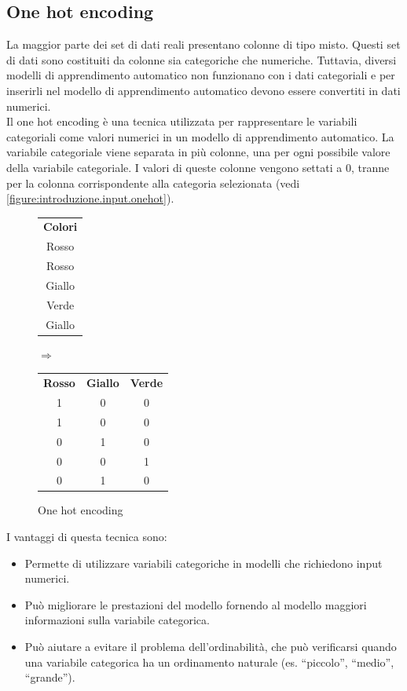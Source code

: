 \documentclass[
	a4paper,
	11pt,
	oneside
]{book}
\theoremstyle{std}
\begin{document}
	\subsection{One hot encoding}
	La maggior parte dei set di dati reali presentano colonne di tipo misto. Questi set di dati sono costituiti da colonne sia categoriche che numeriche. Tuttavia, diversi modelli di apprendimento automatico non funzionano con i dati categoriali e per inserirli nel modello di apprendimento automatico devono essere convertiti in dati numerici. \\
	Il one hot encoding è una tecnica utilizzata per rappresentare le variabili categoriali come valori numerici in un modello di apprendimento automatico. La variabile categoriale viene separata in più colonne, una per ogni possibile valore della variabile categoriale. I valori di queste colonne vengono settati a $ 0 $, tranne per la colonna corrispondente alla categoria selezionata (vedi \autoref{figure:introduzione.input.onehot}). \\
	\begin{figure}[h]
		\centering
		\begin{tabular}{c}
			\textbf{Colori} \\
			Rosso \\
			Rosso \\
			Giallo \\
			Verde \\
			Giallo
		\end{tabular} \hspace{1cm} $ \Longrightarrow $ \hspace{1cm} \begin{tabular}{c c c}
			\textbf{Rosso} & \textbf{Giallo} & \textbf{Verde} \\
			1 & 0 & 0 \\
			1 & 0 & 0 \\
			0 & 1 & 0 \\
			0 & 0 & 1 \\
			0 & 1 & 0
		\end{tabular}
		\caption{One hot encoding}
		\label{figure:introduzione.input.onehot}
	\end{figure}
	I vantaggi di questa tecnica sono:
	\begin{itemize}
		\item Permette di utilizzare variabili categoriche in modelli che richiedono input numerici.
		\item Può migliorare le prestazioni del modello fornendo al modello maggiori informazioni sulla variabile categorica.
		\item Può aiutare a evitare il problema dell'ordinabilità, che può verificarsi quando una variabile categorica ha un ordinamento naturale (es. “piccolo”, “medio”, “grande”).
	\end{itemize}
\end{document}
